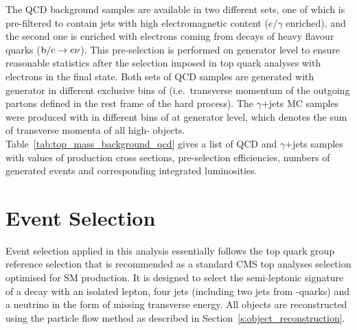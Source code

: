 The QCD background samples are available in two different sets, one of which is pre-filtered to contain jets with high
electromagnetic content ($e/\gamma$ enriched), and the second one is enriched with electrons coming from decays of heavy
flavour quarks ($\mathrm{b}/\mathrm{c} \rightarrow e\nu$). This pre-selection is performed on generator level to ensure reasonable
statistics after the \ttbar selection imposed in top quark analyses with electrons in the final state. Both sets of QCD
samples are generated with \PYTHIA generator in different exclusive bins of \pthat (i.e.\ transverse momentum of the
outgoing partons defined in the rest frame of the hard process). The $\gamma$+jets MC samples were produced with
\MADGRAPH in different bins of \HT at generator level, which denotes the sum of transverse momenta of all high-\pt
objects. Table~\ref{tab:top_mass_background_qcd} gives a list of QCD and $\gamma$+jets samples with values of production
cross sections, pre-selection efficiencies, numbers of generated events and corresponding integrated luminosities.




\clearpage



\section{Event Selection}
\label{s_top_mass:event_selection}
Event selection applied in this analysis essentially follows the top quark group reference selection that is recommended
as a standard CMS top analyses selection optimised for SM \ttbar production. It is designed to select the semi-leptonic
signature of a \ttbar decay with an isolated lepton, four jets (including two jets from \cPqb-quarks) and a neutrino in
the form of missing transverse energy. All objects are reconstructed using the particle flow method as described in
Section~\ref{s:object_reconstruction}.

